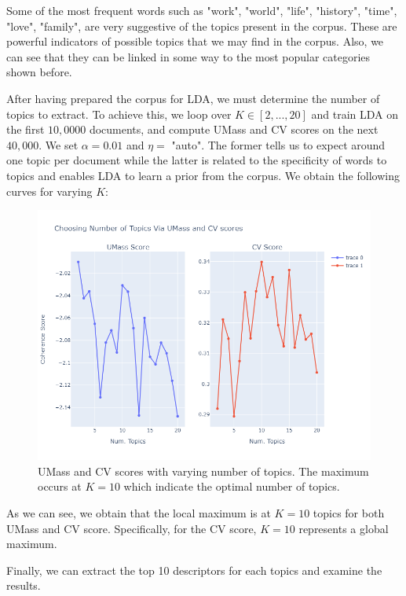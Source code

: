 \documentclass[a4paper,10pt, openright]{article}
\begin{document}
Some of the most frequent words such as "work", "world", "life", "history", "time", "love", "family", are very suggestive of the topics present in the corpus. These are powerful indicators of possible topics that we may find in the corpus. Also, we can see that they can be linked in some way to the most popular categories shown before. 

After having prepared the corpus for LDA, we must determine the number of topics to extract. To achieve this, we loop over $K \in [2,...,20]$ and train LDA on the first $10,0000$ documents, and compute UMass and CV scores on the next $40,000$. We set $\alpha = 0.01$ and $\eta =$ "auto". The former tells us to expect around one topic per document while the latter is related to the specificity of words to topics and enables LDA to learn a prior from the corpus. We obtain the following curves for varying $K$:

\begin{figure}[H]
	\begin{center}
		\includegraphics[width=16 cm, height=9 cm]{./Images/umasscvscore.png}
		\caption{UMass and CV scores with varying number of topics. The maximum occurs at $K=10$ which indicate the optimal number of topics.}
		\label{fig:umasscv}
	\end{center}
\end{figure}

As we can see, we obtain that the local maximum is at $K=10$ topics for both UMass and CV score. Specifically, for the CV score, $K=10$ represents a global maximum. 

Finally, we can extract the top 10 descriptors for each topics and examine the results.
\end{document}
